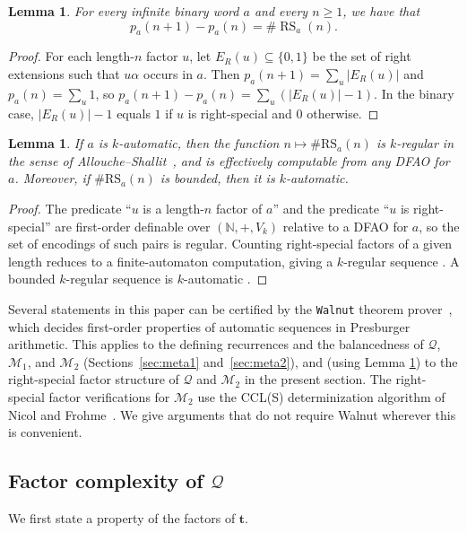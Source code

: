 \documentclass[12pt,reqno]{article}
\theoremstyle{plain}
\newtheorem{lemma}[theorem]{Lemma}
\theoremstyle{definition}
\theoremstyle{remark}
\begin{document}
\begin{lemma}\label{lemcountRS} 
 For every infinite binary word $a$ and every $n\ge 1$, we have that $$ p_a(n+1) - p_a(n) = \#\operatorname{RS}_a(n). $$
\end{lemma}

\begin{proof}
 For each length-$n$ factor $u$, let $E_R(u)\subseteq\{0,1\}$ be the set of right extensions such that $u\alpha$ occurs in $a$. Then 
 $p_a(n+1)=\sum_{u}|E_R(u)|$ and $p_a(n)=\sum_{u}1$, so $p_a(n+1)-p_a(n)=\sum_{u}(|E_R(u)|-1)$. In the binary case,
 $|E_R(u)|-1$ equals $1$ if $u$ is right-special and $0$ otherwise.
\end{proof}

\begin{lemma}\label{RScomputable} 
 If $a$ is $k$-automatic, then the function $n\mapsto \#\mathrm{RS}_a(n)$ is $k$-regular in the sense of 
 Allouche--Shallit~\cite{AlloucheShallit2003}, and is effectively computable
 from any DFAO for $a$. Moreover, if $\#\mathrm{RS}_a(n)$ is bounded, then it is $k$-automatic.
\end{lemma}

\begin{proof}
 The predicate ``$u$ is a length-$n$ factor of $a$'' and the predicate ``$u$ is right-special'' are first-order definable over $(\mathbb{N}, 
 +,V_k)$ relative to a DFAO for $a$, so the set of encodings of such pairs is regular. Counting right-special factors of a given length 
 reduces to a finite-automaton computation, giving a $k$-regular sequence
 \cite[Ch.~16]{AlloucheShallit2003}. A bounded $k$-regular sequence
 is $k$-automatic \cite[Theorem~16.1.5]{AlloucheShallit2003}.
\end{proof}

 Several statements in this paper can be certified by the {\tt Walnut} theorem prover~\cite{Shallit2022}, which decides first-order 
 properties of automatic sequences in Presburger arithmetic. This applies to the defining recurrences and the balancedness
 of $\mathcal{Q}$, $\mathcal{M}_{1}$, and $\mathcal{M}_{2}$ (Sections~\ref{sec:meta1}
 and~\ref{sec:meta2}), and (using Lemma \ref{RScomputable}) to the right-special factor structure of $\mathcal{Q}$ and
 $\mathcal{M}_{2}$ in the present section. The right-special factor verifications for
 $\mathcal{M}_{2}$ use the CCL(S) determinization algorithm of Nicol and Frohme~\cite{NicolFrohme2026}. We give arguments 
 that do not require Walnut wherever
 this is convenient.

\subsection{\texorpdfstring{Factor complexity of $\mathcal{Q}$}{Factor complexity of Q}}
 We first state a property of the factors of $\mathbf{t}$.
\end{document}
